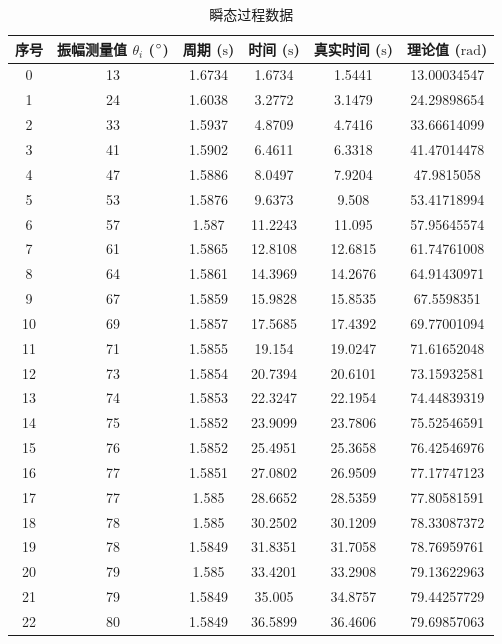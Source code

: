\documentclass{THUexprep}
\begin{document}
\begin{longtable}{|c|c|c|c|c|c|}
  \caption{瞬态过程数据} \\
    \hline
    序号    & 振幅测量值 $\theta_i$ ($\degree$) & 周期 ($\text{s}$) & 时间 ($\text{s}$) & 真实时间 ($\text{s}$) & 理论值 ($\text{rad}$) \\
    \hline
    0     & 13    & 1.6734 & 1.6734 & 1.5441 & 13.00034547 \\
    \hline
    1     & 24    & 1.6038 & 3.2772 & 3.1479 & 24.29898654 \\
    \hline
    2     & 33    & 1.5937 & 4.8709 & 4.7416 & 33.66614099 \\
    \hline
    3     & 41    & 1.5902 & 6.4611 & 6.3318 & 41.47014478 \\
    \hline
    4     & 47    & 1.5886 & 8.0497 & 7.9204 & 47.9815058 \\
    \hline
    5     & 53    & 1.5876 & 9.6373 & 9.508 & 53.41718994 \\
    \hline
    6     & 57    & 1.587 & 11.2243 & 11.095 & 57.95645574 \\
    \hline
    7     & 61    & 1.5865 & 12.8108 & 12.6815 & 61.74761008 \\
    \hline
    8     & 64    & 1.5861 & 14.3969 & 14.2676 & 64.91430971 \\
    \hline
    9     & 67    & 1.5859 & 15.9828 & 15.8535 & 67.5598351 \\
    \hline
    10    & 69    & 1.5857 & 17.5685 & 17.4392 & 69.77001094 \\
    \hline
    11    & 71    & 1.5855 & 19.154 & 19.0247 & 71.61652048 \\
    \hline
    12    & 73    & 1.5854 & 20.7394 & 20.6101 & 73.15932581 \\
    \hline
    13    & 74    & 1.5853 & 22.3247 & 22.1954 & 74.44839319 \\
    \hline
    14    & 75    & 1.5852 & 23.9099 & 23.7806 & 75.52546591 \\
    \hline
    15    & 76    & 1.5852 & 25.4951 & 25.3658 & 76.42546976 \\
    \hline
    16    & 77    & 1.5851 & 27.0802 & 26.9509 & 77.17747123 \\
    \hline
    17    & 77    & 1.585 & 28.6652 & 28.5359 & 77.80581591 \\
    \hline
    18    & 78    & 1.585 & 30.2502 & 30.1209 & 78.33087372 \\
    \hline
    19    & 78    & 1.5849 & 31.8351 & 31.7058 & 78.76959761 \\
    \hline
    20    & 79    & 1.585 & 33.4201 & 33.2908 & 79.13622963 \\
    \hline
    21    & 79    & 1.5849 & 35.005 & 34.8757 & 79.44257729 \\
    \hline
    22    & 80    & 1.5849 & 36.5899 & 36.4606 & 79.69857063 \\
    \hline
\end{longtable}
\end{document}
